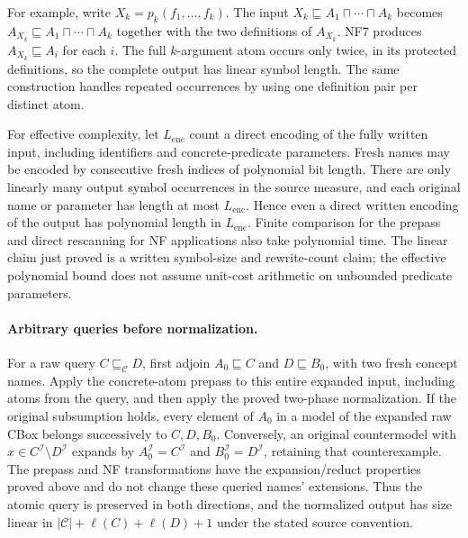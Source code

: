 For example, write \(X_k=p_k(f_1,\ldots,f_k)\).
The input \(X_k\sqsubseteq A_1\sqcap\cdots\sqcap A_k\) becomes
\(A_{X_k}\sqsubseteq A_1\sqcap\cdots\sqcap A_k\) together with the
two definitions of \(A_{X_k}\).
NF7 produces \(A_{X_k}\sqsubseteq A_i\) for each \(i\).
The full \(k\)-argument atom occurs only twice, in its protected definitions,
so the complete output has linear symbol length.  The same construction
handles repeated occurrences by using one definition pair per distinct atom.

For effective complexity, let \(L_{\mathrm{enc}}\) count a direct encoding
of the fully written input, including identifiers and concrete-predicate parameters.
Fresh names may be encoded by consecutive fresh indices of polynomial bit
length.  There are only linearly many output symbol occurrences in the
source measure, and each original name or parameter has length at most
\(L_{\mathrm{enc}}\).  Hence even a direct written encoding of the output
has polynomial length in \(L_{\mathrm{enc}}\).
Finite comparison for the prepass and direct rescanning for NF applications
also take polynomial time.  The linear claim just proved is a written
symbol-size and rewrite-count claim; the effective polynomial bound does
not assume unit-cost arithmetic on unbounded predicate parameters.

\paragraph{Arbitrary queries before normalization.}
For a raw query \(C\sqsubseteq_{\mathcal C}D\), first adjoin
\(A_0\sqsubseteq C\) and \(D\sqsubseteq B_0\), with two fresh concept
names.  Apply the concrete-atom prepass to this entire expanded input,
including atoms from the query, and then apply the proved two-phase
normalization.
If the original subsumption holds, every element of \(A_0\) in a
model of the expanded raw CBox belongs successively to \(C,D,B_0\).
Conversely, an original countermodel with
\(x\in C^{\mathcal I}\setminus D^{\mathcal I}\) expands by
\(A_0^{\mathcal I}=C^{\mathcal I}\) and
\(B_0^{\mathcal I}=D^{\mathcal I}\), retaining that counterexample.
The prepass and NF transformations have the expansion/reduct properties
proved above and do not change these queried names' extensions.
Thus the atomic query is preserved in both directions, and the normalized
output has size linear in
\(|\mathcal C|+\ell(C)+\ell(D)+1\) under the stated source convention.

